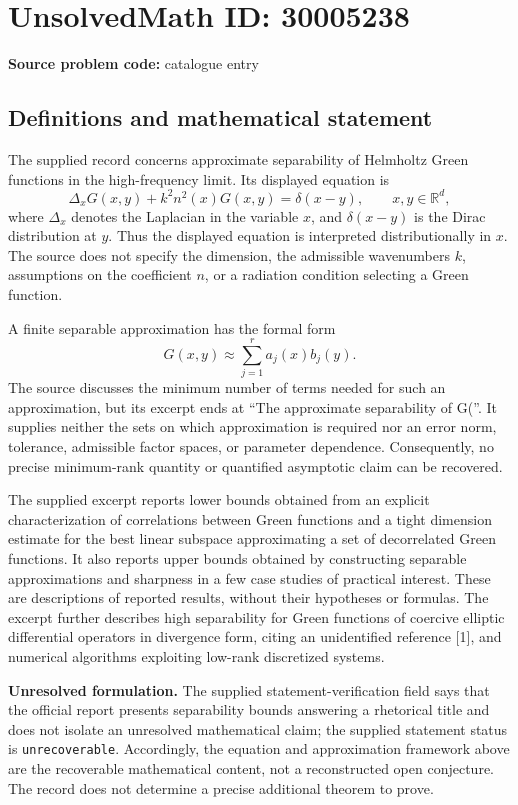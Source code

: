 \documentclass[11pt]{article}
\newcommand{\R}{\mathbb{R}}
\begin{document}
\section*{UnsolvedMath ID: 30005238}
\textbf{Source problem code:} catalogue entry
\subsection{Definitions and mathematical statement}
The supplied record concerns approximate separability of Helmholtz Green functions in the high-frequency limit. Its displayed equation is
\[
\Delta_x G(x,y)+k^2 n^2(x)G(x,y)=\delta(x-y),\qquad x,y\in\R^d,
\]
where \(\Delta_x\) denotes the Laplacian in the variable \(x\), and \(\delta(x-y)\) is the Dirac distribution at \(y\). Thus the displayed equation is interpreted distributionally in \(x\). The source does not specify the dimension, the admissible wavenumbers \(k\), assumptions on the coefficient \(n\), or a radiation condition selecting a Green function.

A finite separable approximation has the formal form
\[
G(x,y)\approx\sum_{j=1}^{r}a_j(x)b_j(y).
\]
The source discusses the minimum number of terms needed for such an approximation, but its excerpt ends at ``The approximate separability of G(''. It supplies neither the sets on which approximation is required nor an error norm, tolerance, admissible factor spaces, or parameter dependence. Consequently, no precise minimum-rank quantity or quantified asymptotic claim can be recovered.

The supplied excerpt reports lower bounds obtained from an explicit characterization of correlations between Green functions and a tight dimension estimate for the best linear subspace approximating a set of decorrelated Green functions. It also reports upper bounds obtained by constructing separable approximations and sharpness in a few case studies of practical interest. These are descriptions of reported results, without their hypotheses or formulas. The excerpt further describes high separability for Green functions of coercive elliptic differential operators in divergence form, citing an unidentified reference [1], and numerical algorithms exploiting low-rank discretized systems.

\textbf{Unresolved formulation.} The supplied statement-verification field says that the official report presents separability bounds answering a rhetorical title and does not isolate an unresolved mathematical claim; the supplied statement status is \texttt{unrecoverable}. Accordingly, the equation and approximation framework above are the recoverable mathematical content, not a reconstructed open conjecture. The record does not determine a precise additional theorem to prove.
\end{document}

